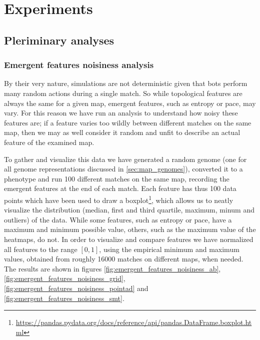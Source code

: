 \documentclass{Configuration_Files/PoliMi3i_thesis}
\begin{document}
\chapter{Experiments}
\section{Pleriminary analyses}
\subsection{Emergent features noisiness analysis}
\label{subsec:emergent_features_noisiness}
By their very nature, simulations are not deterministic given that bots perform many random actions during a single match. So while topological features are always the same for a given map, emergent features, such as entropy or pace, may vary. For this reason we have run an analysis to understand how noisy these features are; if a feature varies too wildly between different matches on the same map, then we may as well consider it random and unfit to describe an actual feature of the examined map.

To gather and visualize this data we have generated a random genome (one for all genome representations discussed in \ref{sec:map_genomes}), converted it to a phenotype and run 100 different matches on the same map, recording the emergent features at the end of each match. Each feature has thus 100 data points which have been used to draw a boxplot\footnote{\url{https://pandas.pydata.org/docs/reference/api/pandas.DataFrame.boxplot.html}}, which allows us to neatly visualize the distribution (median, first and third quartile, maximum, minum and outliers) of the data. While some features, such as entropy or pace, have a maximum and minimum possible value, others, such as the maximum value of the heatmaps, do not. In order to visualize and compare features we have normalized all features to the range $[0, 1]$, using the empirical minimum and maximum values, obtained from roughly 16000 matches on different maps, when needed. The results are shown in figures \ref{fig:emergent_features_noisiness_ab}, \ref{fig:emergent_features_noisiness_grid}, \ref{fig:emergent_features_noisiness_pointad} and \ref{fig:emergent_features_noisiness_smt}.
\end{document}
